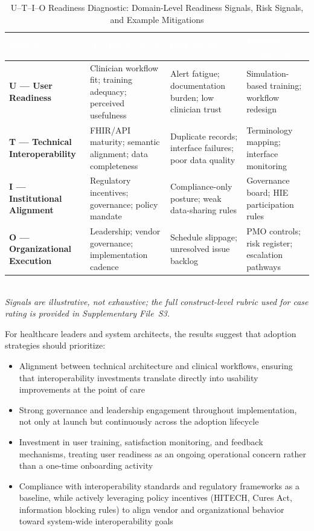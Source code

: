 \begin{table}[H]
\caption{U--T--I--O Readiness Diagnostic: Domain-Level Readiness Signals, Risk Signals, and Example Mitigations}
\label{tab:utio-readiness}
\centering
\footnotesize
\renewcommand{\arraystretch}{1.4}
\setlength{\tabcolsep}{5pt}
\begin{tabular}{p{2.9cm} p{3.6cm} p{3.6cm} p{3.6cm}}
\toprule
\rowcolor{headerblue}
\textcolor{white}{\textbf{Domain}} &
\textcolor{white}{\textbf{Readiness signal}} &
\textcolor{white}{\textbf{Risk signal}} &
\textcolor{white}{\textbf{Example mitigation}} \\
\midrule
\rowcolor{rowgray}
\textbf{U --- User Readiness} &
Clinician workflow fit; training adequacy; perceived usefulness &
Alert fatigue; documentation burden; low clinician trust &
Simulation-based training; workflow redesign \\
\textbf{T --- Technical Interoperability} &
FHIR/API maturity; semantic alignment; data completeness &
Duplicate records; interface failures; poor data quality &
Terminology mapping; interface monitoring \\
\rowcolor{rowgray}
\textbf{I --- Institutional Alignment} &
Regulatory incentives; governance; policy mandate &
Compliance-only posture; weak data-sharing rules &
Governance board; HIE participation rules \\
\textbf{O --- Organizational Execution} &
Leadership; vendor governance; implementation cadence &
Schedule slippage; unresolved issue backlog &
PMO controls; risk register; escalation pathways \\
\bottomrule
\end{tabular}
\vspace{4pt}\\
{\footnotesize \textit{Signals are illustrative, not exhaustive; the full construct-level rubric used for case rating is provided in Supplementary File~S3.}}
\end{table}

For healthcare leaders and system architects, the results suggest that adoption strategies should prioritize:

\begin{itemize}
\item Alignment between technical architecture and clinical workflows, ensuring that interoperability investments translate directly into usability improvements at the point of care
\item Strong governance and leadership engagement throughout implementation, not only at launch but continuously across the adoption lifecycle
\item Investment in user training, satisfaction monitoring, and feedback mechanisms, treating user readiness as an ongoing operational concern rather than a one-time onboarding activity
\item Compliance with interoperability standards and regulatory frameworks as a baseline, while actively leveraging policy incentives (HITECH, Cures Act, information blocking rules) to align vendor and organizational behavior toward system-wide interoperability goals
\end{itemize}

